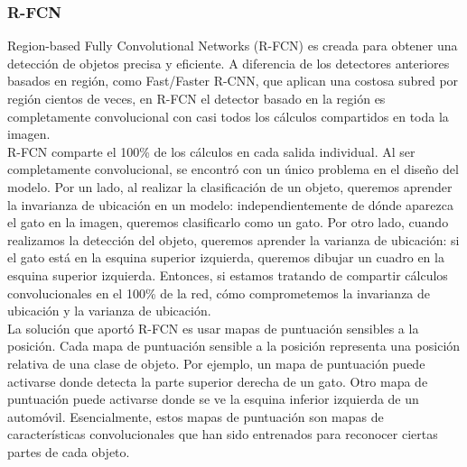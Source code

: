 \documentclass{bmvc2k}
\begin{document}
\subsubsection{R-FCN}

Region-based Fully Convolutional Networks (R-FCN) es creada para obtener una detección de objetos precisa y eficiente. A diferencia de los detectores anteriores basados ​​en región, como Fast/Faster R-CNN, que aplican una costosa subred por región cientos de veces, en R-FCN el detector basado en la región es completamente convolucional con casi todos los cálculos compartidos en toda la imagen.\\

R-FCN comparte el 100\% de los cálculos en cada salida individual. Al ser completamente convolucional, se encontró con un único problema en el diseño del modelo. Por un lado, al realizar la clasificación de un objeto, queremos aprender la invarianza de ubicación en un modelo: independientemente de dónde aparezca el gato en la imagen, queremos clasificarlo como un gato. Por otro lado, cuando realizamos la detección del objeto, queremos aprender la varianza de ubicación: si el gato está en la esquina superior izquierda, queremos dibujar un cuadro en la esquina superior izquierda. Entonces, si estamos tratando de compartir cálculos convolucionales en el 100\% de la red, cómo comprometemos la invarianza de ubicación y la varianza de ubicación.\\

La solución que aportó R-FCN es usar mapas de puntuación sensibles a la posición. Cada mapa de puntuación sensible a la posición representa una posición relativa de una clase de objeto. Por ejemplo, un mapa de puntuación puede activarse donde detecta la parte superior derecha de un gato. Otro mapa de puntuación puede activarse donde se ve la esquina inferior izquierda de un automóvil. Esencialmente, estos mapas de puntuación son mapas de características convolucionales que han sido entrenados para reconocer ciertas partes de cada objeto.\\
\end{document}

